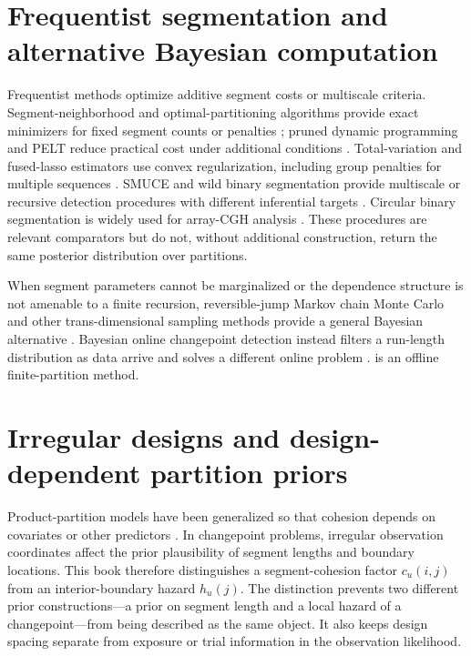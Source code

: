 \section{Frequentist segmentation and alternative Bayesian computation}
Frequentist methods optimize additive segment costs or multiscale criteria. Segment-neighborhood
and optimal-partitioning algorithms provide exact minimizers for fixed segment counts or penalties
\citep{auger1989segment,jackson2005optpart}; pruned dynamic programming and PELT reduce practical
cost under additional conditions \citep{rigaill2010pruned,killick2012pelt}. Total-variation and
fused-lasso estimators use convex regularization, including group penalties for multiple sequences
\citep{rudin1992rof,tibshirani2005fused,bleakley2011groupfused}. SMUCE and wild binary segmentation
provide multiscale or recursive detection procedures with different inferential targets
\citep{frick2014smuce,fryzlewicz2014wbs}. Circular binary segmentation is widely used for array-CGH
analysis \citep{olshen2004cbs}. These procedures are relevant comparators but do not, without
additional construction, return the same posterior distribution over partitions.

When segment parameters cannot be marginalized or the dependence structure is not amenable to a
finite recursion, reversible-jump Markov chain Monte Carlo and other trans-dimensional sampling
methods provide a general Bayesian alternative \citep{green1995rjMCMC,denison1998bayesian}. Bayesian
online changepoint detection instead filters a run-length distribution as data arrive and solves a
different online problem \citep{adamsmackay2007bocpd}. \BayesBreak is an offline finite-partition
method.

\section{Irregular designs and design-dependent partition priors}
Product-partition models have been generalized so that cohesion depends on covariates or other
predictors \citep{park2010gppm,muller2011ppmx}. In changepoint problems, irregular observation
coordinates affect the prior plausibility of segment lengths and boundary locations. This book
therefore distinguishes a segment-cohesion factor $c_u(i,j)$ from an interior-boundary hazard
$h_u(j)$. The distinction prevents two different prior constructions---a prior on segment length and
a local hazard of a changepoint---from being described as the same object. It also keeps design
spacing separate from exposure or trial information in the observation likelihood.

